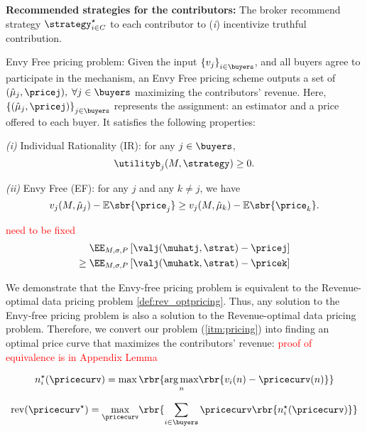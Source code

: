 \textbf{Recommended strategies for the contributors: } The broker recommend strategy $\strategy^{\star}_{i \in C}$ to each contributor to (\emph{i}) incentivize truthful contribution.






\begin{definition}
    Envy Free pricing problem: Given the input $\left\{ v_j \right\}_{i \in \buyers} $, and all buyers agree to participate in the mechanism, an Envy Free pricing scheme outputs a set of $(\hat{\mu}_j,\pricej), \; \forall j \in \buyers$ maximizing the contributors' revenue. Here,  $\left\{(\hat{\mu}_j,\pricej)\right\}_{j \in \buyers}$ represents the assignment: an estimator and a price offered to each buyer. It satisfies the following properties:

    \emph{(i)} Individual Rationality (IR): for any $j \in \buyers$, \[ \utilityb_j(M,\strategy)\geq 0 .\] 

    \emph{(ii)} Envy Free (EF): for any $j$ and any $k \neq j$, we have 
    \[ v_j(M, \hat{\mu}_j) -\mathbb{E}\sbr{\price_j} \geq   v_j(M, \hat{\mu}_k) -\mathbb{E}\sbr{\price_k}. \]    

\textcolor{red}{need to be fixed}
     \begin{align*}
         \EE_{M, \sigma, P}\left[ \valj(\muhatj, \strat) - \pricej \right]  \\ \geq  \EE_{M, \sigma, P}\left[ \valj(\muhatk, \strat) - \pricek \right] 
     \end{align*}
     
\end{definition}



We demonstrate that the Envy-free pricing problem is equivalent to the Revenue-optimal data pricing problem \ref{def:rev_optpricing}. Thus, any solution to the Envy-free pricing problem is also a solution to the Revenue-optimal data pricing problem. Therefore, we convert our problem (\ref{itm:pricing}) into finding an optimal price curve that maximizes the contributors' revenue: \textcolor{red}{proof of equivalence is in Appendix Lemma}

    \begin{align*}
        n^{\star}_i(\pricecurv) = \max \rbr{\underset{n}{\arg\max} \rbr{v_i(n)-\pricecurv(n) }}
    \end{align*}

    \begin{align*}
       \mathrm{rev}(\pricecurv^{\star}) = \underset{\pricecurv}{\max} \rbr{\sum_{i \in \buyers} \pricecurv \rbr{ n^{\star}_i(\pricecurv) }}
    \end{align*}


